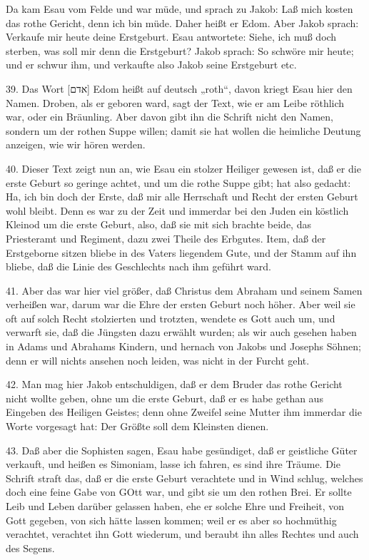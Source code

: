 Da kam Esau vom Felde und war müde, und sprach zu Jakob: Laß mich kosten das rothe Gericht, denn ich bin müde. Daher heißt er Edom. Aber Jakob sprach: Verkaufe mir heute deine Erstgeburt. Esau antwortete: Siehe, ich muß doch sterben, was soll mir denn die Erstgeburt? Jakob sprach: So schwöre mir heute; und er schwur ihm, und verkaufte also Jakob seine Erstgeburt etc.

39. Das Wort [אדם] Edom heißt auf deutsch „roth“, davon kriegt Esau hier den Namen. Droben, als er geboren ward, sagt der Text, wie er am Leibe röthlich war, oder ein Bräunling. Aber davon gibt ihn die Schrift nicht den Namen, sondern um der rothen Suppe willen; damit sie hat wollen die heimliche Deutung anzeigen, wie wir hören werden.

40. Dieser Text zeigt nun an, wie Esau ein stolzer Heiliger gewesen ist, daß er die erste Geburt so geringe achtet, und um die rothe Suppe gibt; hat also gedacht: Ha, ich bin doch der Erste, daß mir alle Herrschaft und Recht der ersten Geburt wohl bleibt. Denn es war zu der Zeit und immerdar bei den Juden ein köstlich Kleinod um die erste Geburt, also, daß sie mit sich brachte beide, das Priesteramt und Regiment, dazu zwei Theile des Erbgutes. Item, daß der Erstgeborne sitzen bliebe in des Vaters liegendem Gute, und der Stamm auf ihn bliebe, daß die Linie des Geschlechts nach ihm geführt ward.

41. Aber das war hier viel größer, daß Christus dem Abraham und seinem Samen verheißen war, darum war die Ehre der ersten Geburt noch höher. Aber weil sie oft auf solch Recht stolzierten und trotzten, wendete es Gott auch um, und verwarft sie, daß die Jüngsten dazu erwählt wurden; als wir auch gesehen haben in Adams und Abrahams Kindern, und hernach von Jakobs und Josephs Söhnen; denn er will
nichts ansehen noch leiden, was nicht in der Furcht geht.

42. Man mag hier Jakob entschuldigen, daß er dem Bruder das rothe Gericht nicht wollte geben, ohne um die erste Geburt, daß er es habe gethan aus Eingeben des Heiligen Geistes; denn ohne Zweifel seine Mutter ihm immerdar die Worte vorgesagt hat: Der Größte soll dem Kleinsten dienen.

43. Daß aber die Sophisten sagen, Esau habe gesündiget, daß er geistliche Güter verkauft, und heißen es Simoniam, lasse ich fahren, es sind ihre Träume. Die Schrift straft das, daß er die erste Geburt verachtete und in Wind schlug, welches doch eine feine Gabe von GOtt war, und gibt sie um den rothen Brei. Er sollte Leib und Leben darüber gelassen haben, ehe er solche Ehre und Freiheit, von Gott gegeben, von sich hätte lassen kommen; weil er es aber so hochmüthig verachtet, verachtet ihn Gott wiederum, und beraubt ihn alles Rechtes und auch des Segens.

